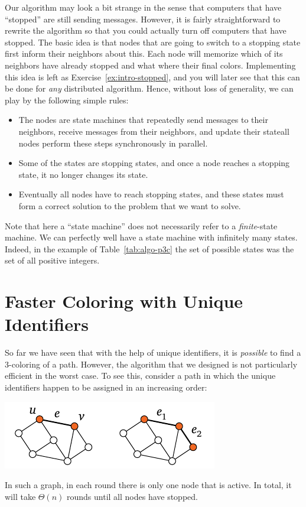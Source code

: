 Our algorithm may look a bit strange in the sense that computers that have ``stopped'' are still sending messages. However, it is fairly straightforward to rewrite the algorithm so that you could actually turn off computers that have stopped. The basic idea is that nodes that are going to switch to a stopping state first inform their neighbors about this. Each node will memorize which of its neighbors have already stopped and what where their final colors. Implementing this idea is left as Exercise~\ref{ex:intro-stopped}, and you will later see that this can be done for \emph{any} distributed algorithm. Hence, without loss of generality, we can play by the following simple rules:
\begin{itemize}
    \item The nodes are state machines that repeatedly send messages to their neighbors, receive messages from their neighbors, and update their state\mydash all nodes perform these steps synchronously in parallel.
    \item Some of the states are stopping states, and once a node reaches a stopping state, it no longer changes its state.
    \item Eventually all nodes have to reach stopping states, and these states must form a correct solution to the problem that we want to solve.
\end{itemize}
Note that here a ``state machine'' does not necessarily refer to a \emph{finite}-state machine. We can perfectly well have a state machine with infinitely many states. Indeed, in the example of Table~\ref{tab:algo-p3c} the set of possible states was the set of all positive integers.


\section{Faster Coloring with Unique Identifiers}\label{sec:algo-p3cbit}

So far we have seen that with the help of unique identifiers, it is \emph{possible} to find a $3$-coloring of a path. However, the algorithm that we designed is not particularly efficient in the worst case. To see this, consider a path in which the unique identifiers happen to be assigned in an increasing order:
\begin{center}
    \includegraphics[page=\PIntroIdBad]{figs.pdf}
\end{center}
In such a graph, in each round there is only one node that is active. In total, it will take $\Theta(n)$ rounds until all nodes have stopped.

